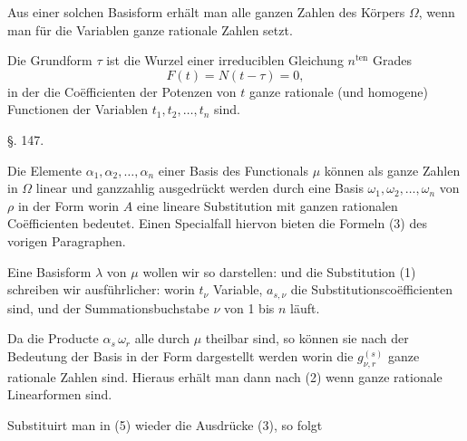 
Aus einer solchen Basisform erhält man alle ganzen Zahlen des Körpers
$\Omega$, wenn man für die Variablen ganze rationale Zahlen setzt.

Die Grundform $\tau$ ist die Wurzel einer irreduciblen Gleichung
$n^{\text{ten}}$ Grades
\[
F(t) = N(t - \tau) = 0,
\]
in der die Co\"efficienten der Potenzen von $t$ ganze rationale (und
homogene) Functionen der Variablen $t_1, t_2, \ldots, t_n$ sind.

\begin{center}
\S. 147.

\end{center}

Die Elemente $\alpha_1, \alpha_2, \ldots, \alpha_n$ einer Basis des
Functionals $\mu$ können als ganze Zahlen in $\Omega$ linear und
ganzzahlig ausgedrückt werden durch eine Basis $\omega_1, \omega_2,
\ldots, \omega_n$ von $\rho$ in der Form
worin $A$ eine lineare Substitution mit ganzen rationalen
Co\"efficienten bedeutet. Einen Specialfall hiervon bieten die Formeln
(3) des vorigen Paragraphen.

Eine Basisform $\lambda$ von $\mu$ wollen wir so darstellen:
und die Substitution (1) schreiben wir ausführlicher:
worin $t_\nu$ Variable, $a_{s,\nu}$ die Substitutionsco\"efficienten
sind, und der Summationsbuchstabe $\nu$ von 1 bis $n$ läuft.

Da die Producte $\alpha_s\,\omega_r$ alle durch $\mu$ theilbar sind, so
können sie nach der Bedeutung der Basis in der Form dargestellt werden
worin die $g^{(s)}_{\nu,r}$ ganze rationale Zahlen sind. Hieraus erhält
man dann nach (2)
wenn
ganze rationale Linearformen sind.

Substituirt man in (5) wieder die Ausdrücke (3), so folgt
